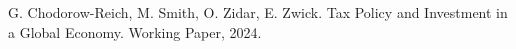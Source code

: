 \documentclass{article}
\begin{document}
\begin{thebibliography}{9}

G. Chodorow-Reich, M. Smith, O. Zidar, E. Zwick. Tax Policy and Investment in a Global Economy. Working Paper, 2024.

\end{thebibliography}
\end{document}
